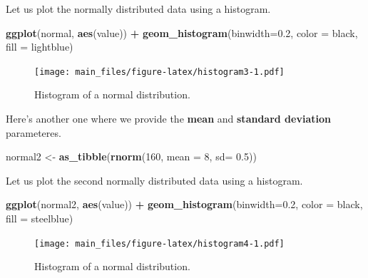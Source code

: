 \documentclass[
]{book}
\newenvironment{Shaded}{\begin{snugshade}}{\end{snugshade}}
\newcommand{\AttributeTok}[1]{\textcolor[rgb]{0.13,0.29,0.53}{#1}}
\newcommand{\DecValTok}[1]{\textcolor[rgb]{0.00,0.00,0.81}{#1}}
\newcommand{\FloatTok}[1]{\textcolor[rgb]{0.00,0.00,0.81}{#1}}
\newcommand{\FunctionTok}[1]{\textcolor[rgb]{0.13,0.29,0.53}{\textbf{#1}}}
\newcommand{\NormalTok}[1]{#1}
\newcommand{\OtherTok}[1]{\textcolor[rgb]{0.56,0.35,0.01}{#1}}
\newcommand{\SpecialCharTok}[1]{\textcolor[rgb]{0.81,0.36,0.00}{\textbf{#1}}}
\newcommand{\StringTok}[1]{\textcolor[rgb]{0.31,0.60,0.02}{#1}}
\begin{document}
Let us plot the normally distributed data using a histogram.

\begin{Shaded}
\begin{Highlighting}[]
\FunctionTok{ggplot}\NormalTok{(normal, }\FunctionTok{aes}\NormalTok{(value)) }\SpecialCharTok{+}
        \FunctionTok{geom\_histogram}\NormalTok{(}\AttributeTok{binwidth=}\FloatTok{0.2}\NormalTok{,}
                       \AttributeTok{color =} \StringTok{\textquotesingle{}black\textquotesingle{}}\NormalTok{,}
                       \AttributeTok{fill =} \StringTok{\textquotesingle{}lightblue\textquotesingle{}}\NormalTok{)}
\end{Highlighting}
\end{Shaded}

\begin{figure}
\centering
\texttt{[image: main\_files/figure-latex/histogram3-1.pdf]}
\caption{\label{fig:histogram3}Histogram of a normal distribution.}
\end{figure}

Here's another one where we provide the \textbf{mean} and \textbf{standard deviation} parameteres.

\begin{Shaded}
\begin{Highlighting}[]
\NormalTok{normal2 }\OtherTok{\textless{}{-}} \FunctionTok{as\_tibble}\NormalTok{(}\FunctionTok{rnorm}\NormalTok{(}\DecValTok{160}\NormalTok{, }\AttributeTok{mean =} \DecValTok{8}\NormalTok{, }\AttributeTok{sd=} \FloatTok{0.5}\NormalTok{))}
\end{Highlighting}
\end{Shaded}

Let us plot the second normally distributed data using a histogram.

\begin{Shaded}
\begin{Highlighting}[]
\FunctionTok{ggplot}\NormalTok{(normal2, }\FunctionTok{aes}\NormalTok{(value)) }\SpecialCharTok{+}
        \FunctionTok{geom\_histogram}\NormalTok{(}\AttributeTok{binwidth=}\FloatTok{0.2}\NormalTok{,}
                       \AttributeTok{color =} \StringTok{\textquotesingle{}black\textquotesingle{}}\NormalTok{,}
                       \AttributeTok{fill =} \StringTok{\textquotesingle{}steelblue\textquotesingle{}}\NormalTok{)}
\end{Highlighting}
\end{Shaded}

\begin{figure}
\centering
\texttt{[image: main\_files/figure-latex/histogram4-1.pdf]}
\caption{\label{fig:histogram4}Histogram of a normal distribution.}
\end{figure}
\end{document}
